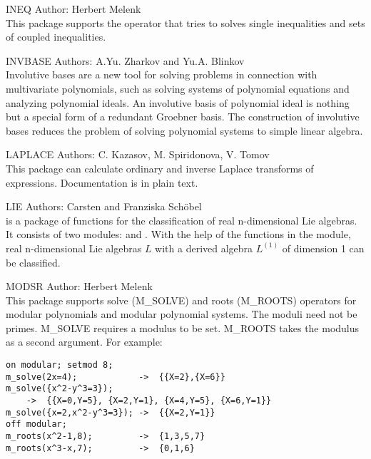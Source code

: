 \begin{Package}{INEQ}
Author: Herbert Melenk\\

This package supports the operator  that
tries to solves single inequalities and sets of coupled inequalities.
\end{Package}

\begin{Package}{INVBASE}
Authors: A.Yu. Zharkov and Yu.A. Blinkov\\

Involutive bases are a new tool for solving problems in connection with
multivariate polynomials, such as solving systems of polynomial equations
and analyzing polynomial ideals.  An involutive basis of polynomial ideal
is nothing but a special form of a redundant Groebner basis.  The
construction of involutive bases reduces the problem of solving polynomial
systems to simple linear algebra.
\end{Package}

\begin{Package}{LAPLACE}
Authors: C. Kazasov, M. Spiridonova, V. Tomov\\

This package can calculate ordinary and inverse Laplace transforms of
expressions.  Documentation is in plain text.
\end{Package}

\begin{Package}{LIE}
Authors: Carsten and Franziska Sch{\"o}bel\\

 is a package of functions for the classification of real
n-dimensional Lie algebras.  It consists of two modules: 
and .  With the help of the functions in the 
module, real n-dimensional Lie algebras $L$ with a derived algebra
$L^{(1)}$ of dimension 1 can be classified.
\end{Package}

\begin{Package}{MODSR}
Author: Herbert Melenk\\

This package supports solve (M\_SOLVE) and roots (M\_ROOTS) operators for
modular polynomials and modular polynomial systems.  The moduli need not
be primes. M\_SOLVE requires a modulus to be set.  M\_ROOTS takes the
modulus as a second argument. For example:

\begin{verbatim}
on modular; setmod 8;
m_solve(2x=4);            ->  {{X=2},{X=6}}
m_solve({x^2-y^3=3});
    ->  {{X=0,Y=5}, {X=2,Y=1}, {X=4,Y=5}, {X=6,Y=1}}
m_solve({x=2,x^2-y^3=3}); ->  {{X=2,Y=1}}
off modular;
m_roots(x^2-1,8);         ->  {1,3,5,7}
m_roots(x^3-x,7);         ->  {0,1,6}
\end{verbatim}
\end{Package}

